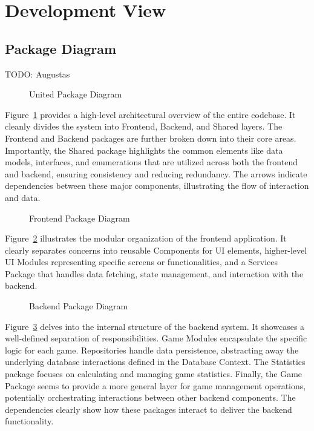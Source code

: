 \documentclass[11pt,a4paper]{article}
\newcommand{\inputdiagram}[1]{}
\newcommand{\textwidthdiagram}[2][1]{%
  \resizebox{#1\textwidth}{!}{\inputdiagram{#2}}%
}
\begin{document}
\section{Development View}

\subsection{Package Diagram}
TODO: Augustas
\begin{figure}[H]
    \centering
    \textwidthdiagram{united_package.latex}
    \caption{United Package Diagram}
    \label{fig:united_package}
\end{figure}

Figure~\ref{fig:united_package} provides a high-level architectural overview of the entire codebase. It cleanly divides the system into Frontend, Backend, and Shared layers. The Frontend and Backend packages are further broken down into their core areas. Importantly, the Shared package highlights the common elements like data models, interfaces, and enumerations that are utilized across both the frontend and backend, ensuring consistency and reducing redundancy. The arrows indicate dependencies between these major components, illustrating the flow of interaction and data.

\begin{figure}[H]
    \centering
    \textwidthdiagram{frontend_package.latex}
    \caption{Frontend Package Diagram}
    \label{fig:frontend_package}
\end{figure}

Figure~\ref{fig:frontend_package} illustrates the modular organization of the frontend application. It clearly separates concerns into reusable Components for UI elements, higher-level UI Modules representing specific screens or functionalities, and a Services Package that handles data fetching, state management, and interaction with the backend.

\begin{figure}[H]
    \centering
    \textwidthdiagram{backend_package.latex}
    \caption{Backend Package Diagram}
    \label{fig:backend_package}
\end{figure}

Figure~\ref{fig:backend_package} delves into the internal structure of the backend system. It showcases a well-defined separation of responsibilities. Game Modules encapsulate the specific logic for each game. Repositories handle data persistence, abstracting away the underlying database interactions defined in the Database Context. The Statistics package focuses on calculating and managing game statistics. Finally, the Game Package seems to provide a more general layer for game management operations, potentially orchestrating interactions between other backend components. The dependencies clearly show how these packages interact to deliver the backend functionality.
\pagebreak
\end{document}
